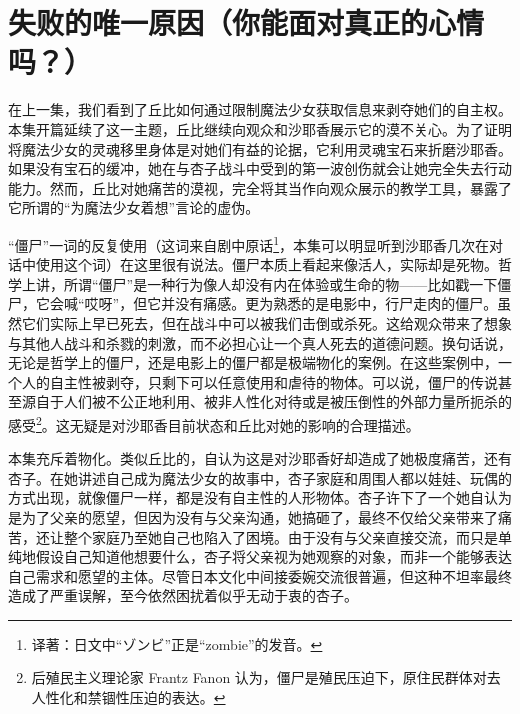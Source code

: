 \chapter[失败的唯一原因（你能面对真正的心情吗？）]{失败的唯一原因\protect\footnotemark（你能面对真正的心情吗？）}

在上一集，我们看到了丘比如何通过限制魔法少女获取信息来剥夺她们的自主权。本集开篇延续了这一主题，丘比继续向观众和沙耶香展示它的漠不关心。为了证明将魔法少女的灵魂移里身体是对她们有益的论据，它利用灵魂宝石来折磨沙耶香。如果没有宝石的缓冲，她在与杏子战斗中受到的第一波创伤就会让她完全失去行动能力。然而，丘比对她痛苦的漠视，完全将其当作向观众展示的教学工具，暴露了它所谓的“为魔法少女着想”言论的虚伪。

“僵尸”一词的反复使用（这词来自剧中原话\footnote{译著：日文中“ゾンビ”正是``zombie''的发音。}，本集可以明显听到沙耶香几次在对话中使用这个词）在这里很有说法。僵尸本质上看起来像活人，实际却是死物。哲学上讲，所谓“僵尸”是一种行为像人却没有内在体验或生命的物——比如戳一下僵尸，它会喊“哎呀”，但它并没有痛感\cite{ref39}。更为熟悉的是电影中，行尸走肉的僵尸。虽然它们实际上早已死去，但在战斗中可以被我们击倒或杀死。这给观众带来了想象与其他人战斗和杀戮的刺激，而不必担心让一个真人死去的道德问题\cite{ref40}。换句话说，无论是哲学上的僵尸，还是电影上的僵尸都是极端物化的案例。在这些案例中，一个人的自主性被剥夺，只剩下可以任意使用和虐待的物体。可以说，僵尸的传说甚至源自于人们被不公正地利用、被非人性化对待或是被压倒性的外部力量所扼杀的感受\footnote{后殖民主义理论家 Frantz Fanon 认为，僵尸是殖民压迫下，原住民群体对去人性化和禁锢性压迫的表达。}\cite{ref41}。这无疑是对沙耶香目前状态和丘比对她的影响的合理描述。

本集充斥着物化。类似丘比的，自认为这是对沙耶香好却造成了她极度痛苦，还有杏子。在她讲述自己成为魔法少女的故事中，杏子家庭和周围人都以娃娃、玩偶的方式出现，就像僵尸一样，都是没有自主性的人形物体。杏子许下了一个她自认为是为了父亲的愿望，但因为没有与父亲沟通，她搞砸了，最终不仅给父亲带来了痛苦，还让整个家庭乃至她自己也陷入了困境。由于没有与父亲直接交流，而只是单纯地假设自己知道他想要什么，杏子将父亲视为她观察的对象，而非一个能够表达自己需求和愿望的主体。尽管日本文化中间接委婉交流很普遍\cite{ref42}，但这种不坦率最终造成了严重误解，至今依然困扰着似乎无动于衷的杏子。

